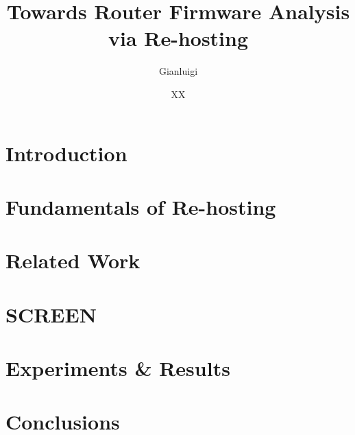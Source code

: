 \documentclass[tg, eng, dv]{ita}    %
\author{Gianluigi}{Dal Toso}
\title{Towards Router Firmware Analysis via Re-hosting}
\date{XX}{NOVEMBER}{2021}
\begin{document}


\mainmatter

\chapter{Introduction}\label{chap:introduction}


\chapter{Fundamentals of Re-hosting}\label{chap:fundamentals}


\chapter{Related Work}\label{chap:related}


\chapter{SCREEN}\label{chap:screen}


\chapter{Experiments \& Results}\label{chap:exp_and_results}


\chapter{Conclusions}\label{chap:conclusions}


% 

% 

% 
\end{document}
